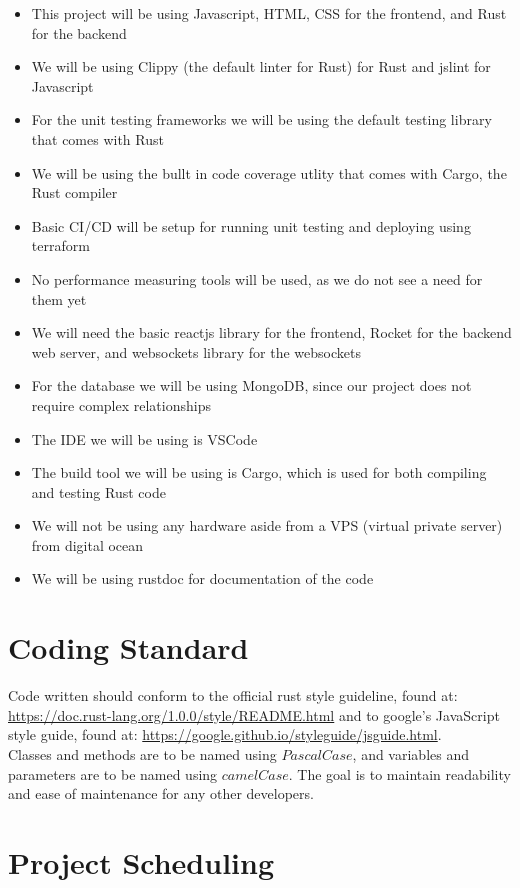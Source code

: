 \documentclass{article}
\begin{document}
\begin{itemize}
\item This project will be using Javascript, HTML, CSS for the frontend, and Rust for the backend
\item We will be using Clippy (the default linter for Rust) for Rust and jslint for Javascript
\item For the unit testing frameworks we will be using the default testing library that comes with Rust
\item We will be using the bullt in code coverage utlity that comes with Cargo, the Rust compiler
\item Basic CI/CD will be setup for running unit testing and deploying using terraform
\item No performance measuring tools will be used, as we do not see a need for them yet
\item We will need the basic reactjs library for the frontend, Rocket for the backend web server, and websockets library for the websockets
\item For the database we will be using MongoDB, since our project does not require complex relationships
\item The IDE we will be using is VSCode
\item The build tool we will be using is Cargo, which is used for both compiling and testing Rust code
\item We will not be using any hardware aside from a VPS (virtual private server) from digital ocean
\item We will be using rustdoc for documentation of the code
\end{itemize}

\section{Coding Standard}

Code written should conform to the official rust style guideline, found at: \url{https://doc.rust-lang.org/1.0.0/style/README.html} and to google's JavaScript style guide, found at: \url{https://google.github.io/styleguide/jsguide.html}.\\
Classes and methods are to be named using $PascalCase$, and variables and parameters are to be named using $camelCase$.
\newline
The goal is to maintain readability and ease of maintenance for any other developers.

\section{Project Scheduling}
\end{document}
